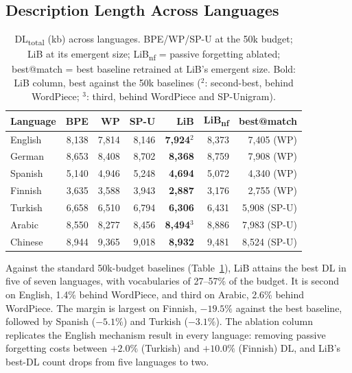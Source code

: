 \documentclass[pdflatex,sn-apa]{sn-jnl}
\begin{document}
\subsection{Description Length Across Languages}

\begin{table}[t]
\centering
\small
\begin{tabular}{lrrrrrr}
\toprule
\textbf{Language} & \textbf{BPE} & \textbf{WP} & \textbf{SP-U} &
\textbf{LiB} & \textbf{LiB\textsubscript{nf}} & \textbf{best@match} \\
\midrule
English  & 8,138 & 7,814 & 8,146 & \textbf{7,924}$^2$ & 8,373 & 7,405 (WP) \\
German   & 8,653 & 8,408 & 8,702 & \textbf{8,368} & 8,759 & 7,908 (WP) \\
Spanish  & 5,140 & 4,946 & 5,248 & \textbf{4,694} & 5,072 & 4,340 (WP) \\
Finnish  & 3,635 & 3,588 & 3,943 & \textbf{2,887} & 3,176 & 2,755 (WP) \\
Turkish  & 6,658 & 6,510 & 6,794 & \textbf{6,306} & 6,431 & 5,908 (SP-U) \\
Arabic   & 8,550 & 8,277 & 8,456 & \textbf{8,494}$^3$ & 8,886 & 7,983 (SP-U) \\
Chinese  & 8,944 & 9,365 & 9,018 & \textbf{8,932} & 9,481 & 8,524 (SP-U) \\
\bottomrule
\end{tabular}
\caption{DL\textsubscript{total} (kb) across languages. BPE/WP/SP-U at the
50k budget; LiB at its emergent size; LiB\textsubscript{nf} = passive
forgetting ablated; best@match = best baseline retrained at LiB's emergent
size. Bold: LiB column, best against the 50k baselines ($^2$: second-best,
behind WordPiece; $^3$: third, behind WordPiece and SP-Unigram).}
\label{tab:dl_multilingual}
\end{table}

Against the standard 50k-budget baselines (Table~\ref{tab:dl_multilingual}),
LiB attains the best DL in five of seven languages, with vocabularies of
27--57\% of the budget. It is second on English, 1.4\% behind WordPiece, and
third on Arabic, 2.6\% behind WordPiece.
The margin is largest on Finnish, $-19.5\%$ against the best baseline,
followed by Spanish ($-5.1\%$) and Turkish ($-3.1\%$).
The ablation column replicates the English mechanism result in every
language: removing passive forgetting costs between $+2.0\%$ (Turkish) and
$+10.0\%$ (Finnish) DL, and LiB's best-DL count drops from five languages to
two.
\end{document}
